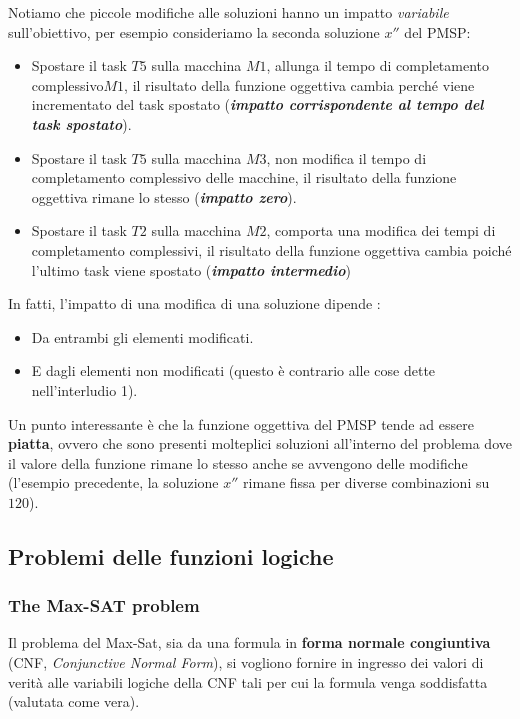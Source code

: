 \documentclass{article}
\begin{document}
Notiamo che piccole modifiche alle soluzioni hanno un impatto \textit{variabile} sull'obiettivo, per esempio
consideriamo la seconda soluzione $x''$ del PMSP:
\begin{itemize}
    \item Spostare il task $T5$ sulla macchina $M1$, allunga il tempo di completamento complessivo$M1$,
          il risultato della funzione oggettiva cambia perché viene incrementato del task spostato (\textit{\textbf{impatto corrispondente al tempo del task spostato}}).
    \item Spostare il task $T5$ sulla macchina $M3$, non modifica il tempo di completamento complessivo
          delle macchine, il risultato della funzione oggettiva rimane lo stesso (\textit{\textbf{impatto zero}}).
    \item Spostare il task $T2$ sulla macchina $M2$, comporta una modifica dei tempi di completamento
          complessivi, il risultato della funzione oggettiva cambia poiché l'ultimo task viene spostato (\textit{\textbf{impatto intermedio}})

\end{itemize}

In fatti, l'impatto di una modifica di una soluzione dipende :
\begin{itemize}
    \item Da entrambi gli elementi modificati.
    \item E dagli elementi non modificati (questo è contrario alle cose dette nell'interludio 1).
\end{itemize}

Un punto interessante è che la funzione oggettiva del PMSP tende ad essere \textbf{piatta}, ovvero che sono presenti
molteplici soluzioni all'interno del problema dove il valore della funzione rimane lo stesso anche se avvengono
delle modifiche (l'esempio precedente, la soluzione $x''$ rimane fissa per diverse combinazioni su $120$).

\subsection{Problemi delle funzioni logiche}
\subsubsection{The Max-SAT problem}
Il problema del Max-Sat, sia da una formula in \textbf{forma normale congiuntiva}
(CNF, \textit{Conjunctive Normal Form}), si vogliono fornire in ingresso dei valori di
verità alle variabili logiche della CNF tali per cui la formula venga
soddisfatta (valutata come vera).
\end{document}
